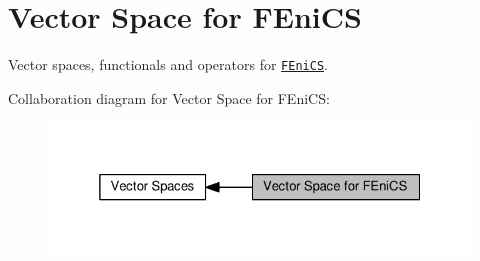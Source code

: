 \hypertarget{group__FenicsGroup}{}\section{Vector Space for F\+Eni\+C\+S}
\label{group__FenicsGroup}


Vector spaces, functionals and operators for \href{http://www.fenicsproject.org}{\tt F\+Eni\+C\+S}.  


Collaboration diagram for Vector Space for F\+Eni\+C\+S\+:\nopagebreak
\begin{figure}[H]
\begin{center}
\leavevmode
\includegraphics[width=325pt]{group__FenicsGroup}
\end{center}
\end{figure}
